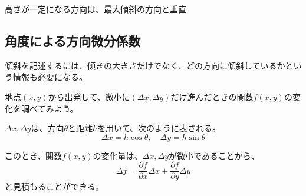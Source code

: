 \documentclass[../../../topic_calculus]{subfiles}
\begin{document}
\begin{emphabox}
  \begin{spacebox}
    \begin{center}
      高さが一定になる方向は、最大傾斜の方向と垂直
    \end{center}
  \end{spacebox}
\end{emphabox}

\subsection{角度による方向微分係数}

傾斜を記述するには、傾きの大きさだけでなく、どの方向に傾斜しているかという情報も必要になる。

\br

地点$(x,y)$から出発して、微小に$(\Delta x, \Delta y)$だけ進んだときの関数$f(x,y)$の変化を調べてみよう。

\begin{center}
\end{center}

$\Delta x, \Delta y$は、方向$\theta$と距離$h$を用いて、次のように表される。
\begin{equation*}
  \Delta x = h \cos \theta , \quad
  \Delta y = h \sin \theta
\end{equation*}

このとき、関数$f(x,y)$の変化量は、$\Delta x, \Delta y$が微小であることから、
\begin{equation*}
  \Delta f = \frac{\partial f}{\partial x}\Delta x + \frac{\partial f}{\partial y}\Delta y
\end{equation*}
と見積もることができる。
\end{document}
